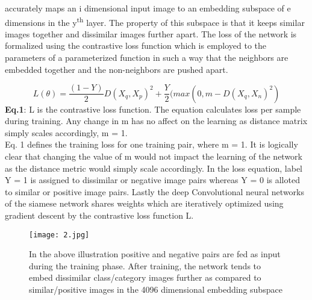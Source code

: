 \documentclass[10pt,twocolumn,letterpaper]{article}
\begin{document}
accurately maps an i dimensional input image to an embedding subspace of e dimensions in the y\textsuperscript{th} layer. The property of this subspace is that it keeps similar images together and dissimilar images further apart. The loss of the network is formalized using the contrastive loss function  \cite{c23} which is employed to the parameters of a parameterized function in such a way that the neighbors are embedded together and the non-neighbors are pushed apart.

\begin{equation}
 L(\theta) = \frac{( 1 - Y)}{2}D(X_q,X_p)^2 + \frac{Y}{2}(max(0,m - D(X_q,X_n)^2)
\end{equation}
\textbf{Eq.1}:  L is the contrastive loss function. The equation calculates loss per sample during training. Any change in m has no affect on the learning as distance matrix simply scales accordingly, m = 1.\\


Eq. 1 defines the training loss for one training pair, where m = 1. It is logically clear that changing the value of m would not impact the learning of the network as the distance metric would simply scale accordingly. In the loss equation, label Y = 1 is assigned to dissimilar or negative image pairs whereas Y = 0 is alloted to similar or positive image pairs. Lastly the deep Convolutional neural networks of the siamese network shares weights which are iteratively optimized using gradient descent by the contrastive loss function L.\\
\begin{figure}[htp]
\centering
\texttt{[image: 2.jpg]}
\caption{In the above illustration positive and negative pairs are fed as input during the training phase. After training, the network tends to embed dissimilar class/category images further as compared to similar/positive images in the 4096 dimensional embedding subspace}
\label{fig:captioning}
\end{figure}
\vspace{-2mm}
\end{document}
